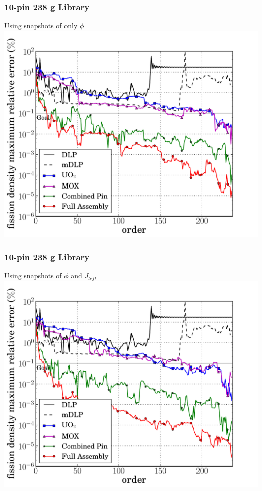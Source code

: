 \documentclass[fleqn]{beamer}
\begin{document}
  \begin{frame}[noframenumbering]
    \frametitle{10-pin 238 g Library}
    \begin{center}
    Using snapshots of only $\phi$
    \includegraphics[trim=.1cm .25cm 2.0cm .4cm, clip=true, totalheight=.8\textheight]{10pin_238_energy_basis_comparison_fission-238}
    \end{center}
  \end{frame}

  \begin{frame}[noframenumbering]
    \frametitle{10-pin 238 g Library}
    \begin{center}
    Using snapshots of $\phi$ and $J_{left}$
    \includegraphics[trim=.1cm .25cm 2.0cm .4cm, clip=true, totalheight=.8\textheight]{10pin_238_partial_energy_basis_comparison_fission-238}
    \end{center}
  \end{frame}
\end{document}
